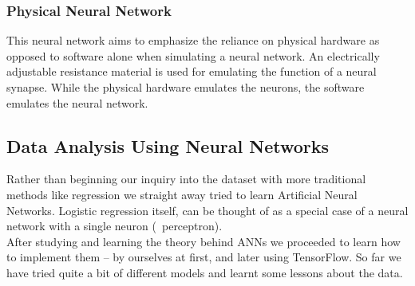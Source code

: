 \subsubsection{Physical Neural Network}
This neural network aims to emphasize the reliance on physical hardware as opposed to software alone when simulating a neural network. An electrically adjustable resistance material is used for emulating the function of a neural synapse. While the physical hardware emulates the neurons, the software emulates the neural network.

\subsection{Data Analysis Using Neural Networks}
Rather than beginning our inquiry into the dataset with more traditional methods like regression we straight away tried to learn Artificial Neural Networks. Logistic regression itself, can be thought of as a special case of a neural network with a single neuron (~perceptron). 
\\
After studying and learning the theory behind ANNs we proceeded to learn how to implement them -- by ourselves at first, and later using TensorFlow. So far we have tried quite a bit of different models and learnt some lessons about the data.
\\
